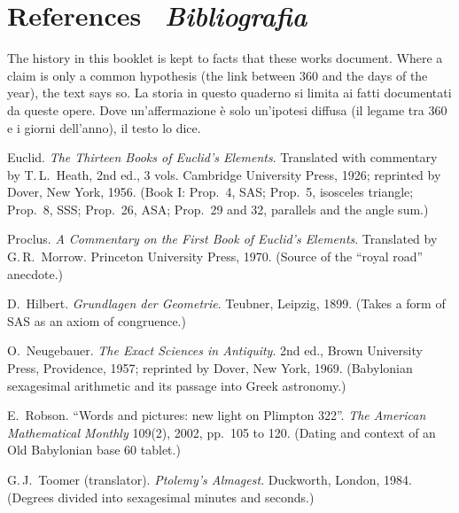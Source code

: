 \section*{References \textperiodcentered\ {\color{itgreen}\itshape Bibliografia}}
\begin{bi}
The history in this booklet is kept to facts that these works document. Where a claim is only a common hypothesis (the link between 360 and the days of the year), the text says so.
\IT
La storia in questo quaderno si limita ai fatti documentati da queste opere. Dove un'affermazione è solo un'ipotesi diffusa (il legame tra 360 e i giorni dell'anno), il testo lo dice.
\end{bi}
{\small
\begin{enumerate}[label={[\arabic*]}, leftmargin=2.2em, itemsep=2pt]
\item Euclid. \emph{The Thirteen Books of Euclid's Elements}. Translated with commentary by T.\,L.~Heath, 2nd ed., 3 vols. Cambridge University Press, 1926; reprinted by Dover, New York, 1956. (Book I: Prop.~4, SAS; Prop.~5, isosceles triangle; Prop.~8, SSS; Prop.~26, ASA; Prop.~29 and 32, parallels and the angle sum.)
\item Proclus. \emph{A Commentary on the First Book of Euclid's Elements}. Translated by G.\,R.~Morrow. Princeton University Press, 1970. (Source of the ``royal road'' anecdote.)
\item D.~Hilbert. \emph{Grundlagen der Geometrie}. Teubner, Leipzig, 1899. (Takes a form of SAS as an axiom of congruence.)
\item O.~Neugebauer. \emph{The Exact Sciences in Antiquity}. 2nd ed., Brown University Press, Providence, 1957; reprinted by Dover, New York, 1969. (Babylonian sexagesimal arithmetic and its passage into Greek astronomy.)
\item E.~Robson. ``Words and pictures: new light on Plimpton 322''. \emph{The American Mathematical Monthly} 109(2), 2002, pp.~105 to 120. (Dating and context of an Old Babylonian base 60 tablet.)
\item G.\,J.~Toomer (translator). \emph{Ptolemy's Almagest}. Duckworth, London, 1984. (Degrees divided into sexagesimal minutes and seconds.)
\end{enumerate}
}
